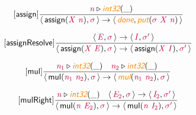 \documentclass[10pt,leqno,fleqn]{article}
\newcommand{\artVariable}[1]{\mbox{\color{purple}\em #1\/}}
\newcommand{\artConstructor}[1]{\mbox{\sf #1}}
\newcommand{\artSpecial}[1]{\mbox{\color{orange}\sf\em #1}}
\begin{document}
\begin{equation}
\tag*{[\artConstructor{\sf assign}]}
\begin{split}\frac{ \artVariable{n}\triangleright \artSpecial{int32}(\_) }{\langle\, \artConstructor{\sf assign}(\artVariable{X}\ \artVariable{n}), \artVariable{$\sigma$}\,\rangle \rightarrow \langle\, \artSpecial{done}, \artSpecial{put}(\artVariable{$\sigma$}\ \artVariable{X}\ \artVariable{n})\,\rangle }
\end{split}
\end{equation}

\begin{equation}
\tag*{[\artConstructor{\sf assignResolve}]}
\begin{split}\frac{\langle\, \artVariable{E}, \artVariable{$\sigma$}\,\rangle \rightarrow \langle\, \artVariable{I}, \artVariable{$\sigma$\/$^\prime$}\,\rangle }{\langle\, \artConstructor{\sf assign}(\artVariable{X}\ \artVariable{E}), \artVariable{$\sigma$}\,\rangle \rightarrow \langle\, \artConstructor{\sf assign}(\artVariable{X}\ \artVariable{I}), \artVariable{$\sigma$\/$^\prime$}\,\rangle }
\end{split}
\end{equation}

\begin{equation}
\tag*{[\artConstructor{\sf mul}]}
\begin{split}\frac{ \artVariable{n$_{1}$}\triangleright \artSpecial{int32}(\_) \quad  \artVariable{n$_{2}$}\triangleright \artSpecial{int32}(\_) }{\langle\, \artConstructor{\sf mul}(\artVariable{n$_{1}$}\ \artVariable{n$_{2}$}), \artVariable{$\sigma$}\,\rangle \rightarrow \langle\, \artSpecial{mul}(\artVariable{n$_{1}$}\ \artVariable{n$_{2}$}), \artVariable{$\sigma$}\,\rangle }
\end{split}
\end{equation}

\begin{equation}
\tag*{[\artConstructor{\sf mulRight}]}
\begin{split}\frac{ \artVariable{n}\triangleright \artSpecial{int32}(\_) \quad \langle\, \artVariable{E$_{2}$}, \artVariable{$\sigma$}\,\rangle \rightarrow \langle\, \artVariable{I$_{2}$}, \artVariable{$\sigma$\/$^\prime$}\,\rangle }{\langle\, \artConstructor{\sf mul}(\artVariable{n}\ \artVariable{E$_{2}$}), \artVariable{$\sigma$}\,\rangle \rightarrow \langle\, \artConstructor{\sf mul}(\artVariable{n}\ \artVariable{I$_{2}$}), \artVariable{$\sigma$\/$^\prime$}\,\rangle }
\end{split}
\end{equation}
\end{document}
